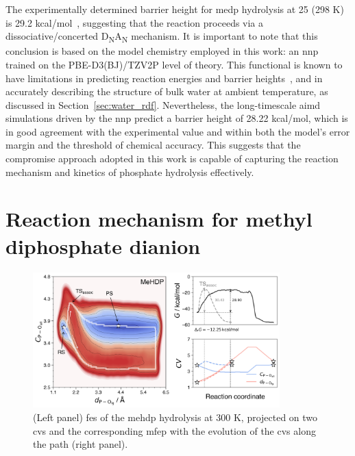 The experimentally determined barrier height for \ac{medp} hydrolysis at 25 (298 K) is 29.2 kcal/mol~\citep{wolfendenDegreesDifficultyWaterConsuming2006}, suggesting that the reaction proceeds via a dissociative/concerted D\textsubscript{N}A\textsubscript{N} mechanism. It is important to note that this conclusion is based on the model chemistry employed in this work: an \ac{nnp} trained on the PBE-D3(BJ)/TZV2P level of theory. This functional is known to have limitations in predicting reaction energies and barrier heights~\citep{burschBestPracticeDFTProtocols2022}, and in accurately describing the structure of bulk water at ambient temperature, as discussed in Section~\ref{sec:water_rdf}. Nevertheless, the long-timescale \ac{aimd} simulations driven by the \ac{nnp} predict a barrier height of 28.22 kcal/mol, which is in good agreement with the experimental value and within both the model’s error margin and the threshold of chemical accuracy. This suggests that the compromise approach adopted in this work is capable of capturing the reaction mechanism and kinetics of phosphate hydrolysis effectively.



\section{Reaction mechanism for methyl diphosphate dianion}

\begin{figure}[b!]
\centering
\includegraphics[width=0.85\textwidth]{Figures/4_Results/results_MeHDP_300K_fes_mfep.png}
\caption{(Left panel) \ac{fes} of the \ac{mehdp} hydrolysis at 300 K, projected on two \acp{cv} and the corresponding \ac{mfep} with the evolution of the \acp{cv} along the path (right panel).}
\label{fig:mehdp_300k_fes_mfep}
\end{figure}

